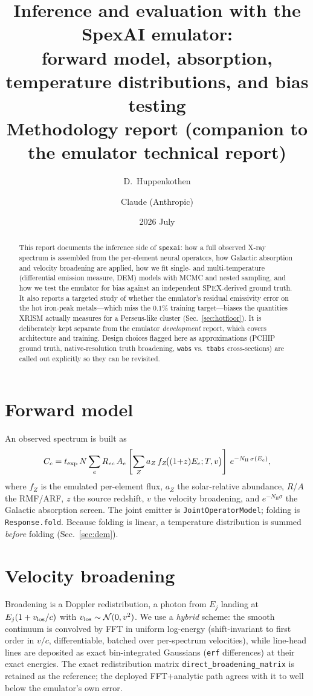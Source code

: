 \documentclass[11pt,a4paper]{article}
\title{Inference and evaluation with the SpexAI emulator:\\
forward model, absorption, temperature distributions, and bias testing\\
\large Methodology report (companion to the emulator technical report)}
\author{D.~Huppenkothen \and Claude (Anthropic)}
\date{2026 July}
\newcommand{\nh}{N_{\mathrm{H}}}
\newcommand{\code}[1]{\texttt{#1}}
\begin{document}
\maketitle

\begin{abstract}
This report documents the inference side of \code{spexai}: how a full observed
X-ray spectrum is assembled from the per-element neural operators, how Galactic
absorption and velocity broadening are applied, how we fit single- and
multi-temperature (differential emission measure, DEM) models with MCMC and
nested sampling, and how we test the emulator for bias against an independent
SPEX-derived ground truth. It also reports a targeted study of whether the
emulator's residual emissivity error on the hot iron-peak metals---which miss
the $0.1\%$ training target---biases the quantities XRISM actually measures for a
Perseus-like cluster (Sec.~\ref{sec:hotfloor}). It is deliberately kept separate
from the emulator \emph{development} report, which covers architecture and
training. Design
choices flagged here as approximations (PCHIP ground truth, native-resolution
truth broadening, \code{wabs} vs.\ \code{tbabs} cross-sections) are called out
explicitly so they can be revisited.
\end{abstract}

\section{Forward model}
An observed spectrum is built as
\begin{equation}
C_c = t_{\rm exp}\,N \sum_e R_{ec}\, A_e
      \left[\sum_Z a_Z\, f_{Z}\!\big((1{+}z)E_e; T, v\big)\right]
      \, e^{-\nh\,\sigma(E_e)} ,
\end{equation}
where $f_Z$ is the emulated per-element flux, $a_Z$ the solar-relative
abundance, $R$/$A$ the RMF/ARF, $z$ the source redshift, $v$ the velocity
broadening, and $e^{-\nh\sigma}$ the Galactic absorption screen. The joint
emitter is \code{JointOperatorModel}; folding is \code{Response.fold}. Because
folding is linear, a temperature distribution is summed \emph{before} folding
(Sec.~\ref{sec:dem}).

\section{Velocity broadening}
Broadening is a Doppler redistribution, a photon from $E_j$ landing at
$E_j(1+v_{\rm los}/c)$ with $v_{\rm los}\sim\mathcal N(0,v^2)$. We use a
\emph{hybrid} scheme: the smooth continuum is convolved by FFT in uniform
log-energy (shift-invariant to first order in $v/c$, differentiable, batched
over per-spectrum velocities), while line-head lines are deposited as exact
bin-integrated Gaussians (\code{erf} differences) at their exact energies. The
exact redistribution matrix \code{direct\_broadening\_matrix} is retained as the
reference; the deployed FFT+analytic path agrees with it to well below the
emulator's own error.
\end{document}
